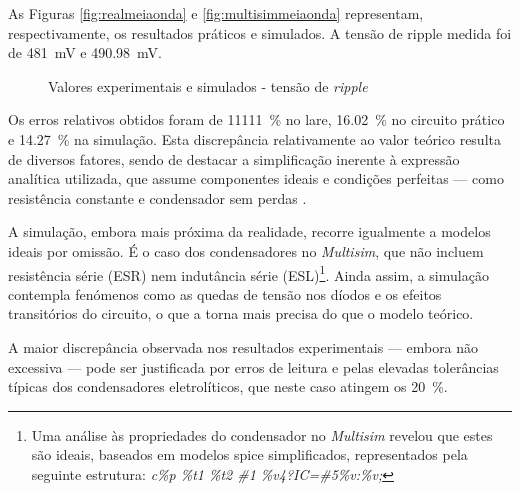 As Figuras \ref{fig:realmeiaonda} e \ref{fig:multisimmeiaonda} representam, respectivamente, os resultados práticos e simulados. A tensão de ripple medida foi de \SI{481}{\milli\volt} e \SI{490.98}{\milli\volt}.

\begin{figure}[hbtp]
	\centering%
		\centering
		\qquad
		\caption{Valores experimentais e simulados - tensão de \textit{ripple}}%
		\label{fig:simulacaoripple}%
	\end{figure}

Os erros relativos obtidos foram de \SI{11111}{\percent} no \acrshort{lare}, \SI{16.02}{\percent} no circuito prático e \SI{14.27}{\percent} na simulação. Esta discrepância relativamente ao valor teórico resulta de diversos fatores, sendo de destacar a simplificação inerente à expressão analítica utilizada, que assume componentes ideais e condições perfeitas — como resistência constante e condensador sem perdas \cite{sedrasmith}.

A simulação, embora mais próxima da realidade, recorre igualmente a modelos ideais por omissão. É o caso dos condensadores no \textit{Multisim}, que não incluem resistência série (ESR) nem indutância série (ESL)\footnote{Uma análise às propriedades do condensador no \textit{Multisim} revelou que estes são ideais, baseados em modelos \acrshort{spice} simplificados, representados pela seguinte estrutura: \textit{c\%p \%t1 \%t2 \#1 \%v4?IC=\#5\%v:\%v;}}. Ainda assim, a simulação contempla fenómenos como as quedas de tensão nos díodos e os efeitos transitórios do circuito, o que a torna mais precisa do que o modelo teórico.

A maior discrepância observada nos resultados experimentais — embora não excessiva — pode ser justificada por erros de leitura e pelas elevadas tolerâncias típicas dos condensadores eletrolíticos, que neste caso atingem os \SI{20}{\percent}\cite{toleranciacondensadores}.

